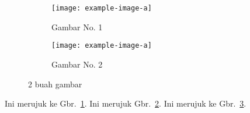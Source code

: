\documentclass{article}
\begin{document}
\begin{figure}[!ht]
	\centering
        \begin{subfigure}[t]{0.4\linewidth}
                \texttt{[image: example-image-a]}
                \caption{Gambar No. 1}\label{fig:a}
        \end{subfigure}
        \begin{subfigure}[t]{0.4\linewidth}
                \texttt{[image: example-image-a]}
                \caption{Gambar No. 2}\label{fig:b}
	\end{subfigure}
\caption{2 buah gambar}\label{fig:contoh}
\end{figure}


Ini merujuk ke Gbr.~\ref{fig:a}. Ini merujuk Gbr.~\ref{fig:b}. Ini merujuk ke
Gbr.~\ref{fig:contoh}.
\end{document}
